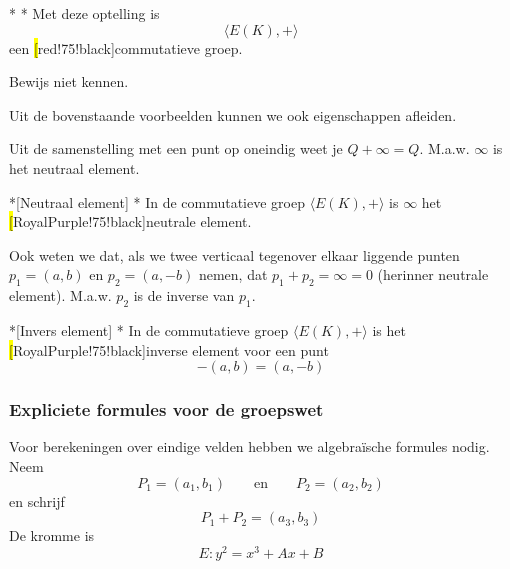 \begin{nicetheorem}*
    \nextpart[]*
    Met deze optelling is
    \begin{equation*}
        \langle E(K), + \rangle
    \end{equation*}
    een \hl[red!75!black]{commutatieve groep}.
\end{nicetheorem}
Bewijs niet kennen.

Uit de bovenstaande voorbeelden kunnen we ook eigenschappen afleiden.

Uit de samenstelling met een punt op oneindig weet je $Q + \infty = Q$. M.a.w. $\infty$ is het neutraal element.

\begin{niceproperty}*[Neutraal element]
    \nextpart[]*
    In de commutatieve groep $\langle E(K), + \rangle$ is $\infty$ het \hl[RoyalPurple!75!black]{neutrale element}.
\end{niceproperty}

Ook weten we dat, als we twee verticaal tegenover elkaar liggende punten $p_1 = (a,b)$ en $p_2 = (a, -b)$ nemen, dat $p_1 + p_2 = \infty = 0$ (herinner neutrale element). M.a.w. $p_2$ is de inverse van $p_1$.

\begin{niceproperty}*[Invers element]
    \nextpart[]*
    In de commutatieve groep $\langle E(K), + \rangle$ is het \hl[RoyalPurple!75!black]{inverse element} voor een punt
    \begin{equation*}
        -(a,b) = (a, -b)
    \end{equation*}
\end{niceproperty}

\subsubsection{Expliciete formules voor de groepswet}

\begin{center}
\resizebox{0.65\textwidth}{!}{%
    
}
\end{center}

Voor berekeningen over eindige velden hebben we algebraïsche formules nodig. Neem
\begin{equation*}
    P_1 = (a_1, b_1) \qquad \text{en} \qquad P_2 = (a_2, b_2)
\end{equation*}
en schrijf
\begin{equation*}
    P_1 + P_2 = (a_3, b_3)
\end{equation*}
De kromme is
\begin{equation*}
    E : y^2 = x^3 + Ax + B
\end{equation*}

